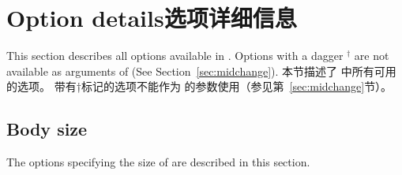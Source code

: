 \section{Option details\hfill 选项详细信息}
\begin{paracol}{2}
This section describes all options available in \Gm.
Options with a dagger $^\dagger$ are not available 
as arguments of  (See Section~\ref{sec:midchange}).
\switchcolumn
本节描述了 \Gm 中所有可用的选项。
带有†标记的选项不能作为  的参数使用（参见第~\ref{sec:midchange}节）。
\end{paracol}

% 
% 

\subsection{Body size}\label{sec:body}

The options specifying the size of  are described in this
section.

